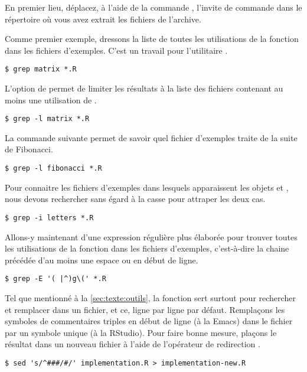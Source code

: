 En premier lieu, déplacez, à l'aide de la commande ,
l'invite de commande dans le répertoire où vous avez extrait les
fichiers de l'archive.

Comme premier exemple, dressons la liste de toutes les utilisations de
la fonction  dans les fichiers d'exemples. C'est un
travail pour l'utilitaire .
\begin{Schunk}
\begin{Verbatim}
$ grep matrix *.R
\end{Verbatim}
\end{Schunk}

L'option  de  permet de limiter les résultats à
la liste des fichiers contenant au moins une utilisation de
.
\begin{Schunk}
\begin{Verbatim}
$ grep -l matrix *.R
\end{Verbatim}
\end{Schunk}

La commande suivante permet de savoir quel fichier d'exemples traite
de la suite de Fibonacci.
\begin{Schunk}
\begin{Verbatim}
$ grep -l fibonacci *.R
\end{Verbatim}
\end{Schunk}

Pour connaitre les fichiers d'exemples dans lesquels apparaissent les
objets  et , nous devons rechercher sans
égard à la casse pour attraper les deux cas.
\begin{Schunk}
\begin{Verbatim}
$ grep -i letters *.R
\end{Verbatim}
\end{Schunk}

Allons-y maintenant d'une expression régulière plus élaborée pour
trouver toutes les utilisations de la fonction  dans les
fichiers d'exemples, c'est-à-dire la chaine  précédée d'au
moins une espace ou en début de ligne.
\begin{Schunk}
\begin{Verbatim}
$ grep -E '( |^)g\(' *.R
\end{Verbatim}
\end{Schunk}

Tel que mentionné à la \autoref{sec:texte:outils}, la fonction
 sert surtout pour rechercher et remplacer dans un fichier,
et ce, ligne par ligne par défaut. Remplaçons les symboles de
commentaires triples \code{\#\#\#} en début de ligne (à la Emacs) dans
le fichier  par un symbole unique \code{\#} (à
la RStudio). Pour faire bonne mesure, plaçons le résultat dans un
nouveau fichier  à l'aide de l'opérateur de
redirection \code{>}.
\begin{Schunk}
\begin{Verbatim}
$ sed 's/^###/#/' implementation.R > implementation-new.R
\end{Verbatim}
\end{Schunk}

